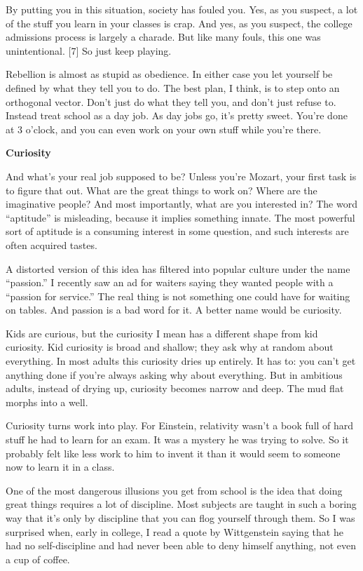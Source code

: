 By putting you in this situation, society has fouled you. Yes, as you
suspect, a lot of the stuff you learn in your classes is crap. And yes,
as you suspect, the college admissions process is largely a charade. But
like many fouls, this one was unintentional. {[}7{]} So just keep
playing.

Rebellion is almost as stupid as obedience. In either case you let
yourself be defined by what they tell you to do. The best plan, I think,
is to step onto an orthogonal vector. Don't just do what they tell you,
and don't just refuse to. Instead treat school as a day job. As day jobs
go, it's pretty sweet. You're done at 3 o'clock, and you can even work
on your own stuff while you're there.

\textbf{Curiosity}

And what's your real job supposed to be? Unless you're Mozart, your
first task is to figure that out. What are the great things to work on?
Where are the imaginative people? And most importantly, what are you
interested in? The word ``aptitude'' is misleading, because it implies
something innate. The most powerful sort of aptitude is a consuming
interest in some question, and such interests are often acquired tastes.

A distorted version of this idea has filtered into popular culture under
the name ``passion.'' I recently saw an ad for waiters saying they
wanted people with a ``passion for service.'' The real thing is not
something one could have for waiting on tables. And passion is a bad
word for it. A better name would be curiosity.

Kids are curious, but the curiosity I mean has a different shape from
kid curiosity. Kid curiosity is broad and shallow; they ask why at
random about everything. In most adults this curiosity dries up
entirely. It has to: you can't get anything done if you're always asking
why about everything. But in ambitious adults, instead of drying up,
curiosity becomes narrow and deep. The mud flat morphs into a well.

Curiosity turns work into play. For Einstein, relativity wasn't a book
full of hard stuff he had to learn for an exam. It was a mystery he was
trying to solve. So it probably felt like less work to him to invent it
than it would seem to someone now to learn it in a class.

One of the most dangerous illusions you get from school is the idea that
doing great things requires a lot of discipline. Most subjects are
taught in such a boring way that it's only by discipline that you can
flog yourself through them. So I was surprised when, early in college, I
read a quote by Wittgenstein saying that he had no self-discipline and
had never been able to deny himself anything, not even a cup of coffee.

